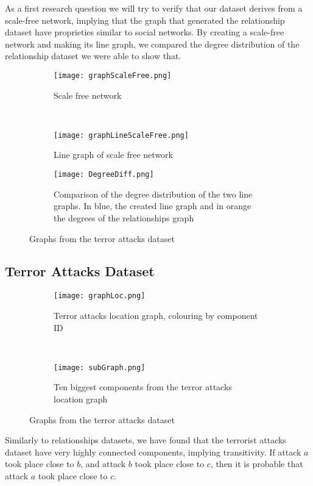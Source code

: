 As a first research question we will try to verify that our dataset derives from a scale-free network, implying that the graph that generated the relationship dataset have proprieties similar to social networks.
By creating a scale-free network and making its line graph, we compared the degree distribution of the relationship dataset we were able to show that.

\begin{figure}[H]
\begin{center}
    \begin{subfigure}[b]{0.45\textwidth}
        \texttt{[image: graphScaleFree.png]}
        \caption{Scale free network}
        \label{fig:Scalefree}
    \end{subfigure}
    ~
    \begin{subfigure}[b]{0.45\textwidth}
        \texttt{[image: graphLineScaleFree.png]}
        \caption{Line graph of scale free network}
        \label{fig:lineG}
    \end{subfigure}
    
    \begin{subfigure}[b]{\textwidth}
    	\begin{centering}
        \texttt{[image: DegreeDiff.png]}
        \caption{Comparison of the degree distribution of the two line graphs. In blue, the created line graph and in orange the degrees of the relationships graph}
        \label{fig:DegDiff}
        \end{centering}
    \end{subfigure}
\caption{Graphs from the terror attacks dataset}
\label{fig:RelationshipScaleFree}
\end{center}
\end{figure}


\subsection{Terror Attacks Dataset}
\label{subsec:Terror Attacks Dataset}

\begin{figure}[H]
\begin{center}
    \begin{subfigure}[b]{0.45\textwidth}
        \texttt{[image: graphLoc.png]}
        \caption{Terror attacks location graph, colouring by component ID}
        \label{fig:graphLoc}
    \end{subfigure}
    ~
    \begin{subfigure}[b]{0.45\textwidth}
        \texttt{[image: subGraph.png]}
        \caption{Ten biggest components from the terror attacks location graph}
        \label{fig:subGraph}
    \end{subfigure}
\caption{Graphs from the terror attacks dataset}
\label{fig:graphPlots}
\end{center}
\end{figure}

Similarly to relationships datasets, we have found that the terrorist attacks dataset have very highly connected components, implying transitivity. 
If attack $a$ took place close to $b$, and attack $b$ took place close to $c$, then it is probable that attack $a$ took place close to $c$.

